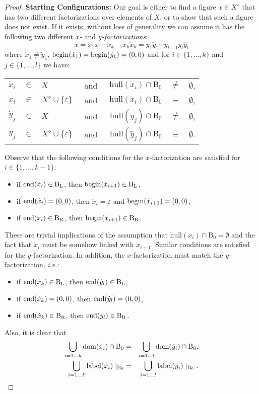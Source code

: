 \documentclass[final,nomarks]{dmtcs-episciences}
\newcommand{\e}{\varepsilon}
\newcommand{\dfempty}{\e}
\newcommand{\dfplus}[1]{#1^{\diamond}}
\newcommand{\dfbegin}[1]{\mbox{\rm begin}(#1)}
\newcommand{\dfend}[1]{\mbox{\rm end}(#1)}
\newcommand{\dflabel}[1]{\mbox{\rm label}(#1)}
\newcommand{\dfdomain}[1]{\mbox{\rm dom}(#1)}
\newcommand{\hull}[1]{\mathrm{hull}(#1)}\newcommand{\hullm}[1]{\mathrm{hull}^{*}(#1)}\newcommand{\block}{{\mathrm B}_0}\newcommand{\rblock}{{\mathrm B}_{\mathrm R}}\newcommand{\lblock}{{\mathrm B}_{\mathrm L}}
\newcommand{\ddx}{\ddot{x}}
\newcommand{\ddy}{\ddot{y}}
\newcommand{\dx}{\dot{x}}
\newcommand{\dy}{\dot{y}}
\begin{document}
\begin{proof}
\textbf{Starting Configurations:}
Our goal is either to find a figure $x\in\dfplus{X}$ that has two different factorizations over 
elements of $X$, or to show that such a figure does not exist. If it exists, without loss 
of generality we can assume it has the following two different
\emph{$x$-} and \emph{$y$-factorizations}:
\begin{displaymath}
x=\dx_1\ddx_1\cdots\ddx_{k-1} \dx_k\ddx_k=\dy_1\ddy_1\cdots\ddy_{l-1} \dy_l\ddy_l
\end{displaymath}
where $\dx_1 \neq \dy_1$, $\dfbegin{\dx_1}=\dfbegin{\dy_1}=(0,0)$ and for $i\in\{1,\ldots,k\}$ and $j\in\{1,\ldots,l\}$
we have:
\begin{center}
\begin{tabular}{rclcrcl}
$\dx_i$  & $\in$ & $X$                          & \ and\  & $\hull{\dx_i}\cap\block$  & $\neq$ & $\emptyset$,\\
$\ddx_i$ & $\in$ & $\dfplus{X}\cup\{\dfempty\}$ & \ and\  & $\hull{\ddx_i}\cap\block$ & =      & $\emptyset$,\\
$\dy_j$  & $\in$ & $X$                          & \ and\  & $\hull{\dy_j}\cap\block$  & $\neq$ & $\emptyset$,\\
$\ddy_j$ & $\in$ & $\dfplus{X}\cup\{\dfempty\}$ & \ and\  & $\hull{\ddy_j}\cap\block$ & =      & $\emptyset$.
\end{tabular}
\end{center}
Observe that the following conditions for the $x$-factorization are satisfied for $i \in \{1,\ldots,k-1\}$:
\begin{itemize}
 \item if $\dfend{\dx_i} \in \lblock$,
 then $\dfbegin{\dx_{i+1}} \in \lblock$,
 \item if $\dfend{\dx_i} = (0,0)$,
 then $\ddx_i = \dfempty$ and $\dfbegin{\dx_{i+1}} = (0,0)$,
 \item if $\dfend{\dx_i} \in \rblock$,
 then $\dfbegin{\dx_{i+1}} \in \rblock$.
\end{itemize}
These are trivial implications of the assumption that $\hull{\ddx_i}\cap\block =
\emptyset$ and the fact that $\dx_i$ must be somehow linked with $\dx_{i+1}$.
Similar conditions are satisfied for the $y$-factorization.
In addition, the $x$-factorization must match the $y$-factorization, \textit{i.e.}:
\begin{itemize}
 \item if $\dfend{\dx_k} \in \lblock$,
 then $\dfend{\dy_l} \in \lblock$,
 \item if $\dfend{\dx_k} = (0,0)$,
 then $\dfend{\dy_l} = (0,0)$,
 \item if $\dfend{\dx_k} \in \rblock$,
 then $\dfend{\dy_l} \in \rblock$.
\end{itemize}
Also, it is clear that
\begin{eqnarray}
 \label{cond:b0dom}\bigcup_{i=1\ldots k}\dfdomain{\dx_i}\cap\block & = &
    \bigcup_{i=1\ldots l}\dfdomain{\dy_i}\cap\block,\\
 \label{cond:b0lab}\bigcup_{i=1\ldots k}\dflabel{\dx_i}\mid_{\block} & = &
    \bigcup_{i=1\ldots l}\dflabel{\dy_i}\mid_{\block}.
\end{eqnarray}


\end{proof}
\end{document}
